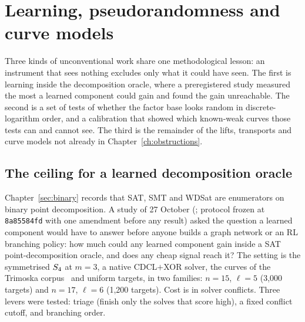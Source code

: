 
\chapter{Learning, pseudorandomness and curve models}\label{ch:learning}

Three kinds of unconventional work share one
methodological lesson: an instrument that sees nothing excludes only what
it could have seen. The first is learning inside the decomposition oracle,
where a preregistered study measured the most a learned component could gain
and found the gain unreachable. The second is a set of tests of whether
the factor base looks random in discrete-logarithm order, and a calibration
that showed which known-weak curves those tests can and cannot see. The
third is the remainder of the lifts, transports and curve models not
already in Chapter~\ref{ch:obstructions}.

\section{The ceiling for a learned decomposition oracle}\label{sec:ln-ceiling}

Chapter~\ref{sec:binary} records that SAT, SMT and WDSat are enumerators on
binary point decomposition. A study of 27 October
(; protocol frozen at
\texttt{8a85584fd} with one amendment before any result) asked the question
a learned component would have to answer before anyone builds a graph
network or an RL branching policy: how much could any learned component
gain inside a SAT point-decomposition oracle, and does any cheap signal
reach it? The setting is the symmetrised $S_{4}$ at $m=3$, a native
CDCL$+$XOR solver, the curves of the Trimoska corpus~\cite{trimoska2020} and
uniform targets, in two families: $n=15$, $\ell=5$ (3{,}000 targets) and $n=17$,
$\ell=6$ (1{,}200 targets). Cost is in solver conflicts. Three levers were
tested: triage (finish only the solves that score high), a fixed conflict
cutoff, and branching order.

